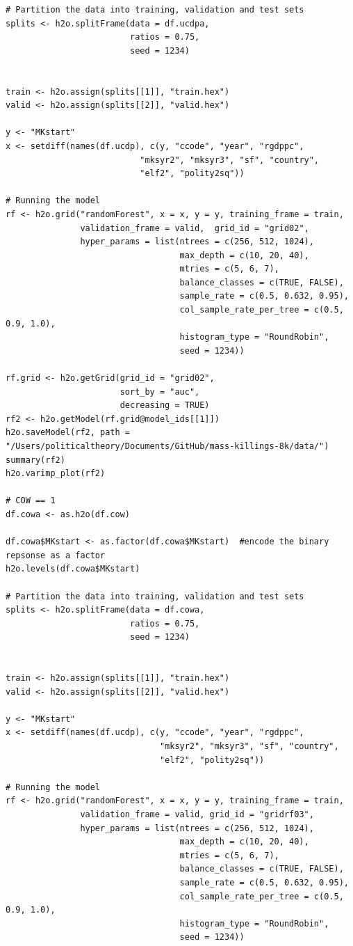 \documentclass[a4paper,12pt]{article}
\begin{document}
\begin{verbatim}
# Partition the data into training, validation and test sets
splits <- h2o.splitFrame(data = df.ucdpa, 
                         ratios = 0.75, 
                         seed = 1234)  


train <- h2o.assign(splits[[1]], "train.hex")   
valid <- h2o.assign(splits[[2]], "valid.hex") 

y <- "MKstart"
x <- setdiff(names(df.ucdp), c(y, "ccode", "year", "rgdppc",
                           "mksyr2", "mksyr3", "sf", "country",
                           "elf2", "polity2sq")) 

# Running the model
rf <- h2o.grid("randomForest", x = x, y = y, training_frame = train, 
               validation_frame = valid,  grid_id = "grid02",
               hyper_params = list(ntrees = c(256, 512, 1024),
                                   max_depth = c(10, 20, 40),
                                   mtries = c(5, 6, 7),
                                   balance_classes = c(TRUE, FALSE),
                                   sample_rate = c(0.5, 0.632, 0.95),
                                   col_sample_rate_per_tree = c(0.5, 0.9, 1.0),
                                   histogram_type = "RoundRobin",
                                   seed = 1234)) 

rf.grid <- h2o.getGrid(grid_id = "grid02",
                       sort_by = "auc",
                       decreasing = TRUE)
rf2 <- h2o.getModel(rf.grid@model_ids[[1]])
h2o.saveModel(rf2, path = "/Users/politicaltheory/Documents/GitHub/mass-killings-8k/data/")
summary(rf2)
h2o.varimp_plot(rf2)

# COW == 1
df.cowa <- as.h2o(df.cow)

df.cowa$MKstart <- as.factor(df.cowa$MKstart)  #encode the binary repsonse as a factor
h2o.levels(df.cowa$MKstart)

# Partition the data into training, validation and test sets
splits <- h2o.splitFrame(data = df.cowa, 
                         ratios = 0.75,  
                         seed = 1234)  


train <- h2o.assign(splits[[1]], "train.hex")   
valid <- h2o.assign(splits[[2]], "valid.hex") 

y <- "MKstart"
x <- setdiff(names(df.ucdp), c(y, "ccode", "year", "rgdppc",
                               "mksyr2", "mksyr3", "sf", "country",
                               "elf2", "polity2sq")) 

# Running the model
rf <- h2o.grid("randomForest", x = x, y = y, training_frame = train, 
               validation_frame = valid, grid_id = "gridrf03",
               hyper_params = list(ntrees = c(256, 512, 1024),
                                   max_depth = c(10, 20, 40),
                                   mtries = c(5, 6, 7),
                                   balance_classes = c(TRUE, FALSE),
                                   sample_rate = c(0.5, 0.632, 0.95),
                                   col_sample_rate_per_tree = c(0.5, 0.9, 1.0),
                                   histogram_type = "RoundRobin",
                                   seed = 1234)) 


\end{verbatim}
\end{document}
